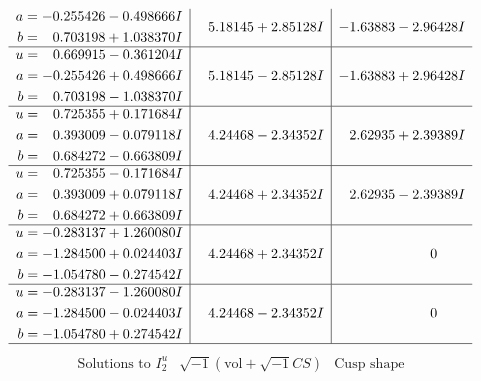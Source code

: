 \documentclass[1p]{elsarticle_modified}
\theoremstyle{definition}
\newcommand{\I}{\sqrt{-1}}
\begin{document}
$$\begin{array}{c|c|c}
\begin{aligned}
a &= -0.255426 - 0.498666 I \\
b &= \phantom{-}0.703198 + 1.038370 I\end{aligned}
 & \phantom{-}5.18145 + 2.85128 I & -1.63883 - 2.96428 I \\ \hline\begin{aligned}
u &= \phantom{-}0.669915 - 0.361204 I \\
a &= -0.255426 + 0.498666 I \\
b &= \phantom{-}0.703198 - 1.038370 I\end{aligned}
 & \phantom{-}5.18145 - 2.85128 I & -1.63883 + 2.96428 I \\ \hline\begin{aligned}
u &= \phantom{-}0.725355 + 0.171684 I \\
a &= \phantom{-}0.393009 - 0.079118 I \\
b &= \phantom{-}0.684272 - 0.663809 I\end{aligned}
 & \phantom{-}4.24468 - 2.34352 I & \phantom{-}2.62935 + 2.39389 I \\ \hline\begin{aligned}
u &= \phantom{-}0.725355 - 0.171684 I \\
a &= \phantom{-}0.393009 + 0.079118 I \\
b &= \phantom{-}0.684272 + 0.663809 I\end{aligned}
 & \phantom{-}4.24468 + 2.34352 I & \phantom{-}2.62935 - 2.39389 I \\ \hline\begin{aligned}
u &= -0.283137 + 1.260080 I \\
a &= -1.284500 + 0.024403 I \\
b &= -1.054780 - 0.274542 I\end{aligned}
 & \phantom{-}4.24468 + 2.34352 I & \phantom{-0.000000 } 0 \\ \hline\begin{aligned}
u &= -0.283137 - 1.260080 I \\
a &= -1.284500 - 0.024403 I \\
b &= -1.054780 + 0.274542 I\end{aligned}
 & \phantom{-}4.24468 - 2.34352 I & \phantom{-0.000000 } 0\\
 \hline 
 \end{array}$$\newpage$$\begin{array}{c|c|c}  
\text{Solutions to }I^u_{2}& \I (\text{vol} + \sqrt{-1}CS) & \text{Cusp shape}\\
 \hline 
\begin{aligned}

\end{aligned}
\end{array}$$
\end{document}
